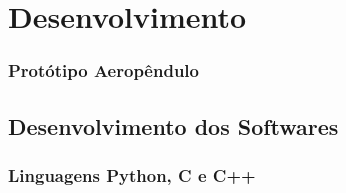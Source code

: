 \chapter{Desenvolvimento}
\label{cap_desenvolvimento}

%






%


\newpage

\subsection{Protótipo Aeropêndulo}
\label{imple_aeropendulo}




\section{Desenvolvimento dos Softwares}
\label{dev_softwares}


\subsection{Linguagens Python, C e C++}



